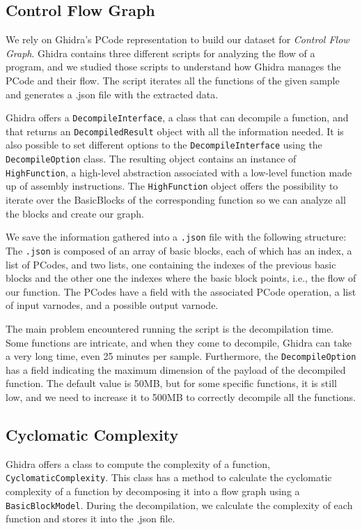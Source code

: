 \subsection{Control Flow Graph}
\label{subsec:cfg_ghidra}
We rely on Ghidra's PCode representation to build our dataset for \textit{Control Flow Graph}. Ghidra contains three different scripts for analyzing the flow of a program, and we studied those scripts to understand how Ghidra manages the PCode and their flow. The script iterates all the functions of the given sample and generates a .json file with the extracted data.

Ghidra offers a \texttt{DecompileInterface}, a class that can decompile a function, and that returns an  \texttt{DecompiledResult} object with all the information needed. It is also possible to set different options to the \texttt{DecompileInterface} using the \texttt{DecompileOption} class. The resulting object contains an instance of \texttt{HighFunction}, a high-level abstraction associated with a low-level function made up of assembly instructions. The \texttt{HighFunction} object offers the possibility to iterate over the BasicBlocks of the corresponding function so we can analyze all the blocks and create our graph.

We save the information gathered into a \texttt{.json} file with the following structure:
The \texttt{.json} is composed of an array of basic blocks, each of which has an index, a list of PCodes, and two lists, one containing the indexes of the previous basic blocks and the other one the indexes where the basic block points, i.e., the flow of our function. The PCodes have a field with the associated PCode operation, a list of input varnodes, and a possible output varnode.

The main problem encountered running the script is the decompilation time. Some functions are intricate, and when they come to decompile, Ghidra can take a very long time, even 25 minutes per sample.  Furthermore, the \texttt{DecompileOption} has a field indicating the maximum dimension of the payload of the decompiled function. The default value is 50MB, but for some specific functions, it is still low, and we need to increase it to 500MB to correctly decompile all the functions.

\subsection{Cyclomatic Complexity}


Ghidra offers a class to compute the complexity of a function, \texttt{CyclomaticComplexity}. This class has a method to calculate the cyclomatic complexity of a function by decomposing it into a flow graph using a \texttt{BasicBlockModel}. During the decompilation, we calculate the complexity of each function and stores it into the .json file.


